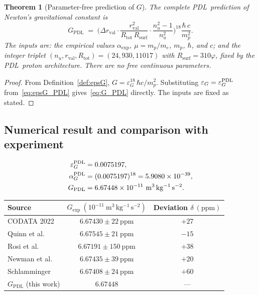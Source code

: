 \documentclass[11pt,a4paper]{article}
\newtheorem{theorem}{Theorem}[section]
\theoremstyle{definition}
\newcommand{\PDL}{\textnormal{PDL}}
\newcommand{\Rsurf}{R_{\mathrm{surf}}}
\newcommand{\Rtot}{R_{\mathrm{tot}}}
\newcommand{\rval}{r_{\mathrm{val}}}
\newcommand{\epsg}{\varepsilon_G}
\newcommand{\GPDL}{G_{\mathrm{PDL}}}
\newcommand{\alphaG}{\alpha_G}
\newcommand{\vp}{\varphi}
\newcommand{\drval}{\Delta r_{\mathrm{val}}}
\begin{document}
\begin{theorem}[Parameter-free prediction of $G$]
  \label{thm:G_prediction}
  The complete \PDL\ prediction of Newton's gravitational constant is
  \begin{equation}
    \label{eq:G_PDL}
    \GPDL \;=\;
    \Biggl(\drval \cdot \frac{\rval^2}{\Rtot\,\Rsurf} \cdot
    \frac{n_u^2-1}{n_u^2}\Biggr)^{\!18}
    \frac{\hbar\,c}{m_p^2}.
  \end{equation}
  The inputs are: the empirical values $\alpha_{\mathrm{exp}}$, $\mu = m_p/m_e$, $m_p$, $\hbar$, and $c$; and the integer triplet $(n_u, \rval, \Rtot) = (24, 930, 11017)$ with $\Rsurf = 310\vp$, fixed by the \PDL\ proton architecture. There are no free continuous parameters.
\end{theorem}

\begin{proof}
  From Definition~\ref{def:epsG}, $G = \epsg^{18}\,\hbar c/m_p^2$. Substituting $\epsg = \epsg^{\PDL}$ from~\eqref{eq:epsG_PDL} gives~\eqref{eq:G_PDL} directly. The inputs are fixed as stated.
\end{proof}

\subsection{Numerical result and comparison with experiment}
\label{subsec:G_numerical}

\begin{align}
  \epsg^{\PDL} &= 0.0075197, \label{eq:epsG_num}\\
  \alphaG^{\PDL} &= (0.0075197)^{18} = 5.9080 \times 10^{-39}, \label{eq:alphaG_num}\\
  \GPDL &= 6.67448 \times 10^{-11}\ \mathrm{m^3\,kg^{-1}\,s^{-2}}.
  \label{eq:G_num}
\end{align}

\begin{center}
\begin{tabular}{lcc}
\toprule
Source
  & $G_{\mathrm{exp}}\ (10^{-11}\ \mathrm{m^3\,kg^{-1}\,s^{-2}})$
  & Deviation $\delta\ (\mathrm{ppm})$ \\
\midrule
CODATA 2022~\cite{CODATA_2022} & $6.67430 \pm 22\ \mathrm{ppm}$ & $+27$ \\
Quinn et al.~\cite{Quinn_2013}       & $6.67545 \pm 21\ \mathrm{ppm}$ & $-15$ \\
Rosi et al.~\cite{Rosi_2014}         & $6.67191 \pm 150\ \mathrm{ppm}$& $+38$ \\
Newman et al.~\cite{Newman_2014}     & $6.67435 \pm 39\ \mathrm{ppm}$ & $+20$ \\
Schlamminger~\cite{Schlamminger_2015}& $6.67408 \pm 24\ \mathrm{ppm}$ & $+60$ \\
\midrule
$\GPDL$ (this work) & $\mathbf{6.67448}$ & --- \\
\bottomrule
\end{tabular}
\end{center}
\end{document}
